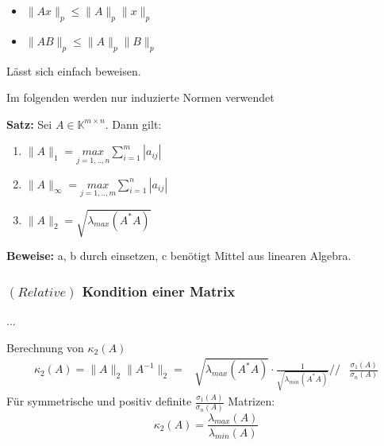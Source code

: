 \begin{itemize}
\item{$\|Ax\|_p \leq \|A\|_p \|x\|_p$}
\item{$\|A B\|_p \leq \|A\|_p \|B\|_p$}
\end{itemize}
Lässt sich einfach beweisen.

Im folgenden werden nur induzierte Normen verwendet

\textbf{Satz:}
Sei $A \in \mathbb{K}^{m \times n}$. Dann gilt:
\begin{enumerate}
\item{$\|A\|_1 = \underset{j = 1,..,n}{max} \sum\limits_{i=1}^{m}{\left|a_{ij}\right|}$ } %
\item{$\|A\|_{\infty} = \underset{j = 1,..,m}{max} \sum\limits_{i=1}^{n}{\left|a_{ij}\right|}$ } %
\item{$\|A\|_2 = \sqrt{\lambda_{max}\left(A^*A\right)}$}
\end{enumerate}
\textbf{Beweise:} a, b durch einsetzen, c benötigt Mittel aus linearen Algebra.

\subsubsection{$\left(Relative\right)$ Kondition einer Matrix}
...

Berechnung von $\kappa_2\left(A\right)$
\begin{equation*}
  \begin{aligned}
    \kappa_2(A) = \|A\|_2 \|A^{-1}\|_2 = &\sqrt{\lambda_{max}\left(A^*A\right)} \cdot \frac{1}{\sqrt{\lambda_{min}\left(A^*A\right)}} //
    & \frac{\sigma_1\left(A\right)}{\sigma_n\left(A\right)}
  \end{aligned}
\end{equation*}
Für symmetrische und positiv definite $\frac{\sigma_1\left(A\right)}{\sigma_n\left(A\right)}$ Matrizen:
\begin{equation*}
  \kappa_2(A) = \frac{\lambda_{max}\left(A\right)}{\lambda_{min}\left(A\right)}
\end{equation*}


